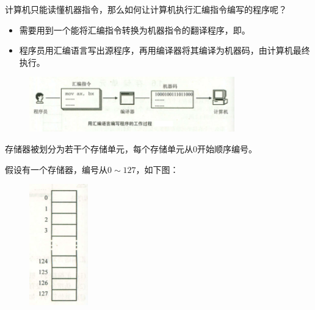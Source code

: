 \begin{frame}\ft{\secname}
  \begin{question}{}
    计算机只能读懂机器指令，那么如何让计算机执行汇编指令编写的程序呢？
  \end{question}
  \pause 

  \begin{itemize}
  \item[]
    需要用到一个能将汇编指令转换为机器指令的翻译程序，即。\\[0.1in]
  \item[]
    程序员用汇编语言写出源程序，再用编译器将其编译为机器码，由计算机最终执行。
  \end{itemize}

  \begin{figure}
    \centering
    \includegraphics[width=3.5in]{slide01/images/asm_process}
  \end{figure}
\end{frame}
% 
\begin{frame}
  存储器被划分为若干个存储单元，每个存储单元从$0$开始顺序编号。

  \begin{exam}{}
    假设有一个存储器，编号从$0\sim 127$，如下图：
  \begin{figure}
    \centering
    \includegraphics[width=1in]{slide01/images/cunchudanyuan}
  \end{figure}
  \end{exam}
\end{frame}
% 
